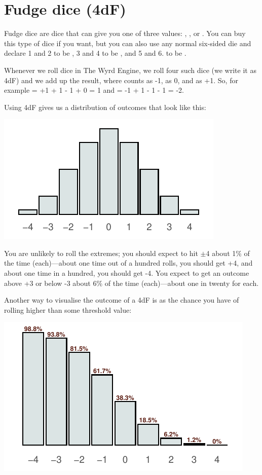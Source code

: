 \section{Fudge dice (4dF)}\label{core:fudge-dice}

Fudge dice are dice that can give you one of three values: \FudgeDie{-}, \FudgeDie{}, or \FudgeDie{+}. You can buy this type of dice if you want, but you can also use any normal six-sided die and declare 1 and 2 to be \FudgeDie{-}, 3 and 4 to be \FudgeDie{}, and 5 and 6. to be \FudgeDie{+}.

Whenever we roll dice in The Wyrd Engine, we roll four such dice (we write it as 4dF) and we add up the result, where \FudgeDie{-} counts as -1, \FudgeDie{} as 0, and \FudgeDie{+} as +1. So, for example
	 = +1 + 1 - 1 + 0 = 1
	and 
	\FudgeRes{-+--} = -1 + 1 - 1 - 1 = -2.

Using 4dF gives us a distribution of outcomes that look like this:
\begin{center}
\includegraphics{stats/4dF.pdf}
\end{center}

You are unlikely to roll the extremes; you should expect to hit $\pm$4 about 1\% of the time (each)---about one time out of a hundred rolls, you should get +4, and about one time in a hundred, you should get -4. You expect to get an outcome above +3 or below -3 about 6\% of the time (each)---about one in twenty for each.

Another way to visualise the outcome of a 4dF is as the chance you have of rolling higher than some threshold value:

\begin{center}
\includegraphics{stats/4dF-success.pdf}
\end{center}

